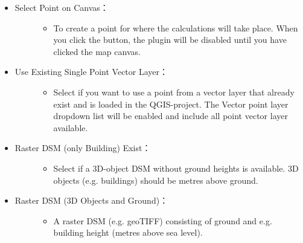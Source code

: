 \documentclass[letterpaper,10pt,english]{sphinxmanual}
\begin{document}
\begin{itemize}
\item {} \begin{description}
\item[{Select Point on Canvas：}] \leavevmode\begin{itemize}
\item {} 
To create a point for where the calculations will take place. When you click the button, the plugin will be disabled until you have clicked the map canvas.

\end{itemize}

\end{description}

\item {} \begin{description}
\item[{Use Existing Single Point Vector Layer：}] \leavevmode\begin{itemize}
\item {} 
Select if you want to use a point from a vector layer that already exist and is loaded in the QGIS-project. The Vector point layer dropdown list will be enabled and include all point vector layer available.

\end{itemize}

\end{description}

\item {} \begin{description}
\item[{Raster DSM (only Building) Exist：}] \leavevmode\begin{itemize}
\item {} 
Select if a 3D-object DSM without ground heights is available. 3D objects (e.g. buildings) should be metres above ground.

\end{itemize}

\end{description}

\item {} \begin{description}
\item[{Raster DSM (3D Objects and Ground)：}] \leavevmode\begin{itemize}
\item {} 
A raster DSM (e.g. geoTIFF) consisting of ground and e.g. building height (metres above sea level).


\end{itemize}
\end{description}
\end{itemize}
\end{document}
